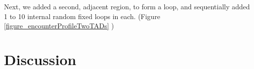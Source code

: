 \documentclass[12pt]{article}
\begin{document}
Next, we added a second, adjacent region, to form a loop, and sequentially added 1 to 10 internal random fixed loops in each. (Figure \ref{figure_encounterProfileTwoTADs} ) %




\section{Discussion}\label{section_discussion}
\end{document}
